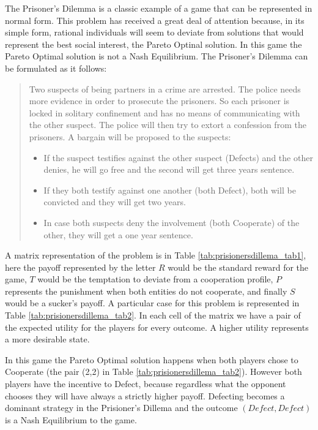 The Prisoner's Dilemma is a classic example of a game that can be represented
in normal form\cite{Osborne2004}. This problem has received a great deal of attention
because, in its simple form, rational individuals will seem to deviate
from solutions that would represent the best social interest,
the Pareto Optinal solution. In this game the Pareto Optimal solution
is not a Nash Equilibrium. The Prisoner's Dilemma can be formulated
as it follows:

\begin{quotation}

Two suspects of being partners in a crime are arrested. The police
needs more evidence in order to prosecute the prisoners. So each
prisoner is locked in solitary confinement and has no means of communicating
with the other suspect. The police will then try to extort a confession
from the prisoners. A bargain will be proposed to the suspects:
\begin{itemize}
\item If the suspect testifies against the other suspect (Defects) and the other denies, he will
go free and the second will get three years sentence.
\item If they both testify against one another (both Defect), both will
be convicted and they will get two years.
\item In case both suspects deny the involvement (both Cooperate) of the
other, they will get a one year sentence.
\end{itemize}
\end{quotation}

A matrix representation of the problem is in Table \ref{tab:prisionersdillema_tab1}, here the payoff represented by the letter $R$ would be the standard reward for the game, $T$ would be the temptation to deviate from a cooperation profile, $P$ represents the punishment when both entities do not cooperate, and finally $S$ would be a sucker's payoff. A particular case for this problem is represented in Table \ref{tab:prisionersdillema_tab2}. In each cell of the matrix we have a pair of the expected utility for the players for every outcome. A higher utility represents a more desirable state.

In this game the Pareto Optimal solution happens when both players chose to Cooperate (the pair (2,2) in Table \ref{tab:prisionersdillema_tab2}). However both players have the incentive to Defect, because regardless what the opponent chooses they will have always a strictly higher payoff. Defecting becomes a dominant strategy in the Prisioner's Dillema and the outcome $(Defect, Defect)$ is a Nash Equilibrium to the game. 

